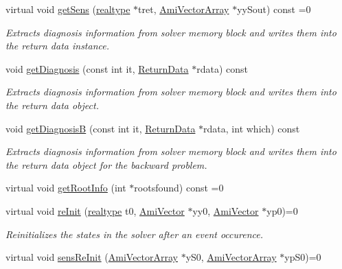 \begin{DoxyCompactItemize}
virtual void \mbox{\hyperlink{classamici_1_1_solver_a0db027ca9e9778c0b40afdb80f11a3af}{get\+Sens}} (\mbox{\hyperlink{namespaceamici_a1bdce28051d6a53868f7ccbf5f2c14a3}{realtype}} $\ast$tret, \mbox{\hyperlink{classamici_1_1_ami_vector_array}{Ami\+Vector\+Array}} $\ast$yy\+Sout) const =0
\begin{DoxyCompactList}\small\item\em Extracts diagnosis information from solver memory block and writes them into the return data instance. \end{DoxyCompactList}\item 
void \mbox{\hyperlink{classamici_1_1_solver_a07318808fed3463ea8de7f25e3698343}{get\+Diagnosis}} (const int it, \mbox{\hyperlink{classamici_1_1_return_data}{Return\+Data}} $\ast$rdata) const
\begin{DoxyCompactList}\small\item\em Extracts diagnosis information from solver memory block and writes them into the return data object. \end{DoxyCompactList}\item 
void \mbox{\hyperlink{classamici_1_1_solver_aa7aec3090326db73739483e141e65cda}{get\+DiagnosisB}} (const int it, \mbox{\hyperlink{classamici_1_1_return_data}{Return\+Data}} $\ast$rdata, int which) const
\begin{DoxyCompactList}\small\item\em Extracts diagnosis information from solver memory block and writes them into the return data object for the backward problem. \end{DoxyCompactList}\item 
virtual void \mbox{\hyperlink{classamici_1_1_solver_acab2ddcee3d62bef9f3e186aee8898e9}{get\+Root\+Info}} (int $\ast$rootsfound) const =0
\item 
virtual void \mbox{\hyperlink{classamici_1_1_solver_acfcd1423675ef1abc302f3ac50353932}{re\+Init}} (\mbox{\hyperlink{namespaceamici_a1bdce28051d6a53868f7ccbf5f2c14a3}{realtype}} t0, \mbox{\hyperlink{classamici_1_1_ami_vector}{Ami\+Vector}} $\ast$yy0, \mbox{\hyperlink{classamici_1_1_ami_vector}{Ami\+Vector}} $\ast$yp0)=0
\begin{DoxyCompactList}\small\item\em Reinitializes the states in the solver after an event occurence. \end{DoxyCompactList}\item 
virtual void \mbox{\hyperlink{classamici_1_1_solver_a5a982db994b0ee9127a2f688e3b38911}{sens\+Re\+Init}} (\mbox{\hyperlink{classamici_1_1_ami_vector_array}{Ami\+Vector\+Array}} $\ast$y\+S0, \mbox{\hyperlink{classamici_1_1_ami_vector_array}{Ami\+Vector\+Array}} $\ast$yp\+S0)=0

\end{DoxyCompactItemize}
